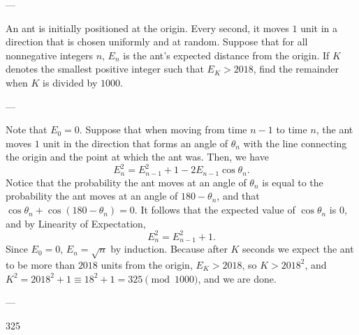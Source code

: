 
---

An ant is initially positioned at the origin. Every second, it moves $1$ unit in a direction that is chosen uniformly and at random. Suppose that for all nonnegative integers $n$, $E_n$ is the ant's expected distance from the origin. If $K$ denotes the smallest positive integer such that $E_K>2018$, find the remainder when $K$ is divided by $1000$. 

---

Note that $E_0=0$. Suppose that when moving from time $n-1$ to time $n$, the ant moves $1$ unit in the direction that forms an angle of $\theta_n$ with the line connecting the origin and the point at which the ant was. Then, we have $$E_n^2=E_{n-1}^2+1-2E_{n-1}\cos\theta_n.$$
Notice that the probability the ant moves at an angle of $\theta_n$ is equal to the probability the ant moves at an angle of $180-\theta_n$, and that $\cos\theta_n+\cos\left(180-\theta_n\right)=0$. It follows that the expected value of $\cos\theta_n$ is $0$, and by Linearity of Expectation, $$E_n^2=E_{n-1}^2+1.$$
Since $E_0=0$, $E_n=\sqrt{n}$ by induction. Because after $K$ seconds we expect the ant to be more than $2018$ units from the origin, $E_K>2018$, so $K>2018^2$, and $K^2=2018^2+1\equiv 18^2+1=325\pmod{1000}$, and we are done.

---

325

